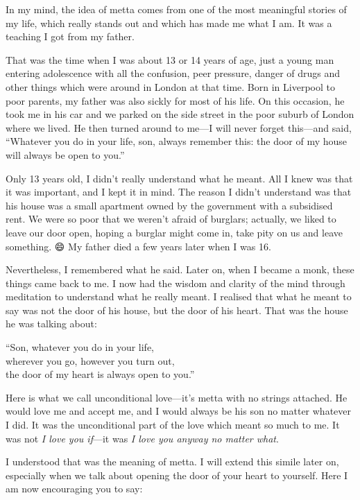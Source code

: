 \documentclass[12pt, openany]{book}
\newenvironment{aphorism}%
{%
\begin{center}\begin{itshape}
}%
{\end{itshape}\end{center}
}%
\begin{document}
In my mind, the idea of metta comes from one of the most meaningful stories of my life, which really stands out and which has made me what I am. It was a teaching I got from my father. 

That was the time when I was about 13 or 14 years of age, just a young man entering adolescence with all the confusion, peer pressure, danger of drugs and other things which were around in London at that time. Born in Liverpool to poor parents, my father was also sickly for most of his life. On this occasion, he took me in his car and we parked on the side street in the poor suburb of London where we lived. He then turned around to me—I will never forget this—and said, “Whatever you do in your life, son, always remember this: the door of my house will always be open to you.” 

Only 13 years old, I didn’t really understand what he meant. All I knew was that it was important, and I kept it in mind. The reason I didn’t understand was that his house was a small apartment owned by the government with a subsidised rent. We were so poor that we weren’t afraid of burglars; actually, we liked to leave our door open, hoping a burglar might come in, take pity on us and leave something. 😄 My father died a few years later when I was 16. 

Nevertheless, I remembered what he said. Later on, when I became a monk, these things came back to me. I now had the wisdom and clarity of the mind through meditation to understand what he really meant. I realised that what he meant to say was not the door of his house, but the door of his heart. That was the house he was talking about: 

\begin{aphorism}
“Son, whatever you do in your life,\\  
wherever you go, however you turn out,\\ 
the door of my heart is always open to you.”
\end{aphorism}

Here is what we call unconditional love—it’s metta with no strings attached. He would love me and accept me, and I would always be his son no matter whatever I did. It was the unconditional part of the love which meant so much to me. It was not \emph{I love you if}—it was \emph{I love you anyway no matter what}. 

I understood that was the meaning of metta. I will extend this simile later on, especially when we talk about opening the door of your heart to yourself. Here I am now encouraging you to say: 
\end{document}
